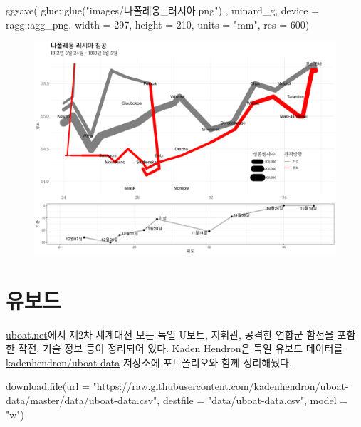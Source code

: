 \documentclass[
  letterpaper,
  chapter,a4paper,showtrims,openright,hidelinks]{oblivoir}
\newenvironment{Shaded}{\begin{snugshade}}{\end{snugshade}}
\newcommand{\AttributeTok}[1]{\textcolor[rgb]{0.40,0.45,0.13}{#1}}
\newcommand{\DecValTok}[1]{\textcolor[rgb]{0.68,0.00,0.00}{#1}}
\newcommand{\FunctionTok}[1]{\textcolor[rgb]{0.28,0.35,0.67}{#1}}
\newcommand{\NormalTok}[1]{\textcolor[rgb]{0.00,0.23,0.31}{#1}}
\newcommand{\SpecialCharTok}[1]{\textcolor[rgb]{0.37,0.37,0.37}{#1}}
\newcommand{\StringTok}[1]{\textcolor[rgb]{0.13,0.47,0.30}{#1}}
\begin{document}
\begin{Shaded}
\begin{Highlighting}[]
\FunctionTok{ggsave}\NormalTok{( glue}\SpecialCharTok{::}\FunctionTok{glue}\NormalTok{(}\StringTok{"images/나폴레옹\_러시아.png"}\NormalTok{) , }
\NormalTok{        minard\_g,}
        \AttributeTok{device =}\NormalTok{ ragg}\SpecialCharTok{::}\NormalTok{agg\_png, }
        \AttributeTok{width =} \DecValTok{297}\NormalTok{, }\AttributeTok{height =} \DecValTok{210}\NormalTok{, }\AttributeTok{units =} \StringTok{"mm"}\NormalTok{, }\AttributeTok{res =} \DecValTok{600}\NormalTok{)}
\end{Highlighting}
\end{Shaded}

\begin{figure}

{\centering \includegraphics{images/나폴레옹_러시아.png}

}

\end{figure}

\hypertarget{uxc720uxbcf4uxb4dc}{%
\chapter{유보드}\label{uxc720uxbcf4uxb4dc}}

\autocite{hendron2016germany}

\href{https://uboat.net/}{uboat.net}에서 제2차 세계대전 모든 독일 U보트,
지휘관, 공격한 연합군 함선을 포함한 작전, 기술 정보 등이 정리되어 있다.
Kaden Hendron은 독일 유보드 데이터를
\href{https://github.com/kadenhendron/uboat-data}{kadenhendron/uboat-data}
저장소에 포트폴리오와 함께 정리해뒀다.

\begin{Shaded}
\begin{Highlighting}[]
\FunctionTok{download.file}\NormalTok{(}\AttributeTok{url =} \StringTok{"https://raw.githubusercontent.com/kadenhendron/uboat{-}data/master/data/uboat{-}data.csv"}\NormalTok{, }
              \AttributeTok{destfile =} \StringTok{"data/uboat{-}data.csv"}\NormalTok{, }\AttributeTok{model =} \StringTok{"w"}\NormalTok{)}
\end{Highlighting}
\end{Shaded}
\end{document}
